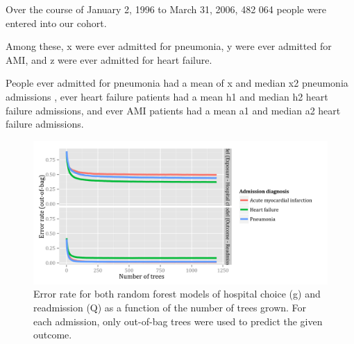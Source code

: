 \documentclass[]{article}\usepackage[]{graphicx}\usepackage[]{color}
\begin{document}
Over the course of January 2, 1996 to March 31, 2006, 482 064 people were entered into our cohort. 

Among these, x were ever admitted for pneumonia, y were ever admitted for AMI, and z were ever admitted for heart failure. 

People ever admitted for pneumonia had a mean of x and median x2 pneumonia admissions , ever heart failure patients had a mean h1 and median h2 heart failure admissions, and ever AMI patients had a mean a1 and median a2 heart failure admissions.




\begin{figure}[H]
    \includegraphics{../figures/error_rate_for_hospital_choice.png}
    \caption[Error rate for random forest model of hospital choice.]
      {Error rate for both random forest models of hospital choice (g) and readmission (Q) as a function of the number of trees grown. For each admission, only out-of-bag trees were used to predict the given outcome.}
    \label{fig:error_rate_for_hospital_choice}
\end{figure}

% 
\end{document}
